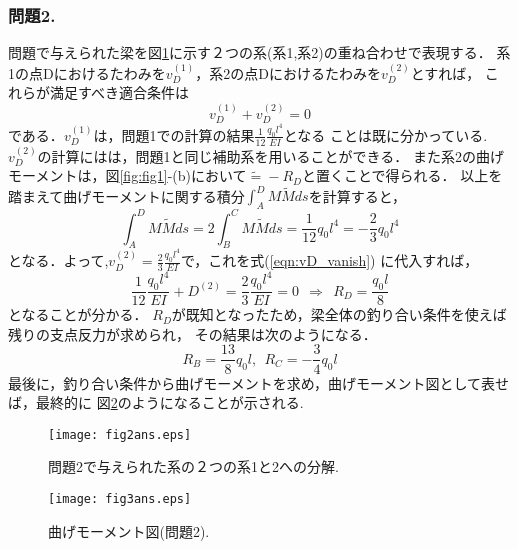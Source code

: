 \documentclass[10pt,a4j]{jarticle}
\begin{document}
\subsubsection*{問題2.}
問題で与えられた梁を図\ref{fig:fig2}に示す２つの系(系1,系2)の重ね合わせで表現する．
系1の点Dにおけるたわみを$v^{(1)}_D$，系2の点Dにおけるたわみを$v^{(2)}_D$とすれば，
これらが満足すべき適合条件は
\begin{equation}
	v^{(1)}_D
	+
	v^{(2)}_D
	=0
\end{equation}
である．$v_D^{(1)}$は，問題1での計算の結果$\frac{1}{12}\frac{q_0l^4}{EI}$となる
ことは既に分かっている.$v^{(2)}_D$の計算にはは，問題1と同じ補助系を用いることができる．
また系2の曲げモーメントは，図\ref{fig:fig1}-(b)において$\tilde =-R_D$と置くことで得られる．
以上を踏まえて曲げモーメントに関する積分$\int_A^DM\tilde M ds $を計算すると，
\begin{equation}
	\int_A^D M\tilde Mds= 2\int_B^CM \tilde Mds=\frac{1}{12}q_0l^4=-\frac{2}{3}q_0l^4
\end{equation}
となる．よって,$v_D^{(2)}=\frac{2}{3}\frac{q_0l^4}{EI}$で，これを式(\ref{eqn:vD_vanish})
に代入すれば，
\begin{equation}
	\frac{1}{12}\frac{q_0l^4}{EI}
	+
	D^{(2)}=\frac{2}{3}\frac{q_0l^4}{EI}
	=0 \ \ \Rightarrow \ \ 
	R_D=\frac{q_0l}{8}
\end{equation}
となることが分かる．
$R_D$が既知となったため，梁全体の釣り合い条件を使えば残りの支点反力が求められ，
その結果は次のようになる．
\begin{equation}
	R_B=\frac{13}{8}q_0l, \ \ R_C=-\frac{3}{4}q_0l
\end{equation}
最後に，釣り合い条件から曲げモーメントを求め，曲げモーメント図として表せば，最終的に
図\ref{fig:fig3}のようになることが示される.
\begin{figure}
	\vspace{10mm}
	\begin{center}
	\texttt{[image: fig2ans.eps]} 
	\end{center}
	\caption{問題2で与えられた系の２つの系1と2への分解. } 
	\label{fig:fig2}
\end{figure}
\begin{figure}
	\vspace{10mm}
	\begin{center}
	\texttt{[image: fig3ans.eps]} 
	\end{center}
	\caption{曲げモーメント図(問題2). } 
	\label{fig:fig3}
\end{figure}
\end{document}
